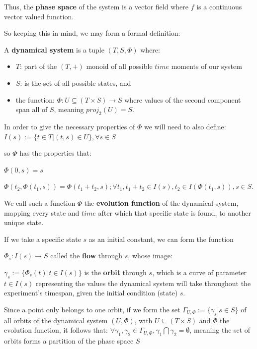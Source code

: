 Thus, the \textbf{phase space} of the system is a vector field where $f$ is a continuous vector valued function.

So keeping this in mind, we may form a formal definition:

\begin{definition}
  A \textbf{dynamical system} is a tuple $(T,S,\Phi)$ where:

  \begin{itemize}
    \item $T$: part of the $(T,+)$ monoid of all possible $time$ moments of our system
    \item $S$: is the set of all possible states, and
    \item the function: $\Phi : U \subseteq (T \times S ) \rightarrow S$ where values of the second component span all of $S$, meaning $proj_2(U) = S$.
  \end{itemize}
  In order to give the necessary properties of $\Phi$ we will need to also define:
  $I(s):= \{ t \in T | (t,s) \in U \}, \forall s \in S$

  so $\Phi$ has the properties that:

  $\Phi(0,s) = s$

  $\Phi(t_2,\Phi(t_1,s)) = \Phi(t_1+t_2,s); \forall t_1, t_1+t_2 \in I(s), t_2 \in I(\Phi(t_1,s)), s \in S$.

  We call such a function $\Phi$ the \textbf{evolution function} of the dynamical system, mapping every state and $time$ after which that specific state is found, to another unique state.
\end{definition}

If we take a specific state $s$ as an initial constant, we can form the function

$\Phi_s : I(s) \rightarrow S$
called the \textbf{flow} through $s$, whose image:

$\gamma_s:=\{\Phi_s(t) | t\in I(s) \}$
is the \textbf{orbit} through $s$,
which is a curve of parameter $t \in I(s)$ representing the values the dynamical system will take throughout the experiment's timespan, given the initial condition (state) $s$.

Since a point only belongs to one orbit, if we form the set
$\Gamma_{U,\Phi}:=\{ \gamma_s | s \in S \}$
of all orbits of the dynamical system $(U,\Phi)$, with $U\subseteq (T \times S)$ and $\Phi$ the evolution function, it follows that:
$\forall \gamma_1,\gamma_2 \in \Gamma_{U, \Phi}, \gamma_1 \bigcap \gamma_2 = \emptyset$, meaning the set of orbits forms a partition of the phase space $S$


